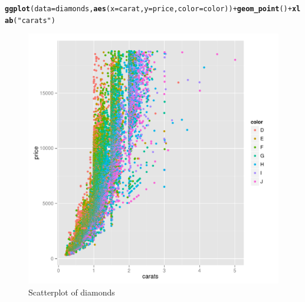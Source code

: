 \documentclass{article}\usepackage[]{graphicx}\usepackage[]{color}
\makeatletter
\newcommand{\hlstr}[1]{\textcolor[rgb]{0.192,0.494,0.8}{#1}}%
\newcommand{\hlopt}[1]{\textcolor[rgb]{0,0,0}{#1}}%
\newcommand{\hlstd}[1]{\textcolor[rgb]{0.345,0.345,0.345}{#1}}%
\newcommand{\hlkwc}[1]{\textcolor[rgb]{0.333,0.667,0.333}{#1}}%
\newcommand{\hlkwd}[1]{\textcolor[rgb]{0.737,0.353,0.396}{\textbf{#1}}}%
\newenvironment{kframe}{%
 \def\at@end@of@kframe{}%
 \ifinner\ifhmode%
  \def\at@end@of@kframe{\end{minipage}}%
  \begin{minipage}{\columnwidth}%
 \fi\fi%
 \def\FrameCommand##1{\hskip\@totalleftmargin \hskip-\fboxsep
 \colorbox{shadecolor}{##1}\hskip-\fboxsep
     \hskip-\linewidth \hskip-\@totalleftmargin \hskip\columnwidth}%
 \MakeFramed {\advance\hsize-\width
   \@totalleftmargin\z@ \linewidth\hsize
   \@setminipage}}%
 {\par\unskip\endMakeFramed%
 \at@end@of@kframe}
\newenvironment{knitrout}{}{} %
\makeatother
\begin{document}
\begin{knitrout}
\color{fgcolor}\begin{kframe}
\begin{alltt}
\hlkwd{ggplot}\hlstd{(}\hlkwc{data}\hlstd{=diamonds,} \hlkwd{aes}\hlstd{(}\hlkwc{x}\hlstd{=carat,}\hlkwc{y}\hlstd{=price,} \hlkwc{color}\hlstd{=color))} \hlopt{+} \hlkwd{geom_point}\hlstd{()} \hlopt{+} \hlkwd{xlab}\hlstd{(}\hlstr{"carats"}\hlstd{)}
\end{alltt}
\end{kframe}\begin{figure}[]

\includegraphics[width=.95\linewidth]{figure/diamonds-plot2} \caption[Scatterplot of diamonds]{Scatterplot of diamonds\label{fig:diamonds-plot2}}
\end{figure}


\end{knitrout}
\end{document}
